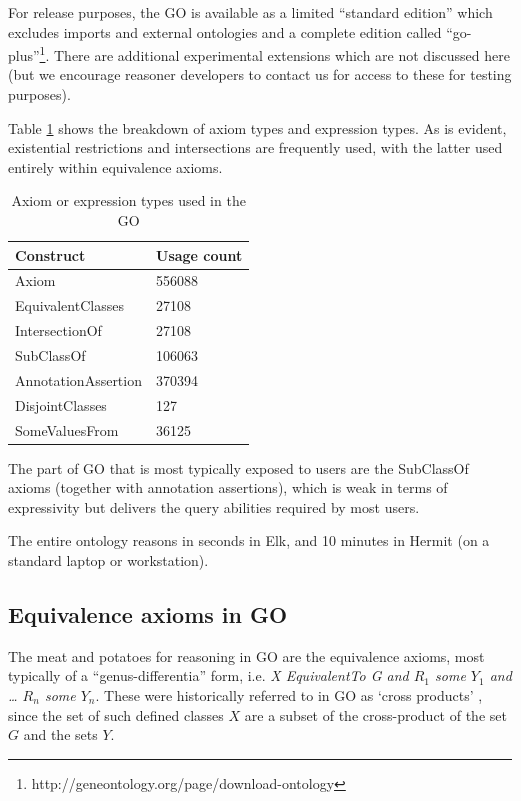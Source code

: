 \documentclass{llncs}
\begin{document}
For release purposes, the GO is available as a limited ``standard
edition'' which excludes imports and external ontologies and a
complete edition called
``go-plus''\footnote{http://geneontology.org/page/download-ontology}. There
are additional experimental extensions which are not discussed here
(but we encourage reasoner developers to contact us for access to
these for testing purposes).

Table \ref{tab:constructs} shows the breakdown of axiom types and
expression types. As is evident, existential restrictions and
intersections are frequently used, with the latter used entirely
within equivalence axioms.

\begin{table}
\begin{tabular}{ | p{4cm} | p{3cm} |  }
\hline
\textbf{Construct} & \textbf{Usage count}  \\
\hline
Axiom & 556088 \\
EquivalentClasses & 27108 \\
IntersectionOf & 27108 \\
SubClassOf & 106063  \\
AnnotationAssertion & 370394 \\
DisjointClasses & 127 \\
SomeValuesFrom & 36125 \\
\hline
\end{tabular}
\caption{Axiom or expression types used in the GO }
\label{tab:constructs}
\end{table}

The part of GO that is most typically exposed to users are the
SubClassOf axioms (together with annotation assertions), which is weak
in terms of expressivity but delivers the query abilities required by
most users.

The entire ontology reasons in seconds in Elk\cite{kazakov2012elk}, and 10
minutes in Hermit (on a standard laptop or workstation).

\subsection{Equivalence axioms in GO}

The meat and potatoes for reasoning in GO are the equivalence axioms,
most typically of a ``genus-differentia'' form, i.e. \emph{X
  EquivalentTo G and $R_1$ some $Y_1$ and … $R_n$ some $Y_n$}. These were
historically referred to in GO as `cross
products' \cite{Mungall2010GOXP}, since the set of such defined classes
$X$ are a subset of the cross-product of the set $G$ and the sets
$Y$.
\end{document}
